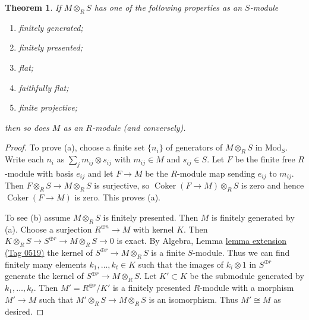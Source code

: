 \documentclass{amsart}
\theoremstyle{plain}
\newtheorem{theorem}[subsection]{Theorem}
\theoremstyle{definition}
\theoremstyle{remark}
\numberwithin{equation}{subsection}
\def\Coker{\mathop{\mathrm{Coker}}}
\begin{document}
\begin{theorem}
\label{theorem-descend-module-properties}
If $M \otimes_R S$ has one of the following properties as an $S$-module
\begin{enumerate}
\item[(a)]
finitely generated;
\item[(b)]
finitely presented;
\item[(c)]
flat;
\item[(d)]
faithfully flat;
\item[(e)]
finite projective;
\end{enumerate}
then so does $M$ as an $R$-module (and conversely).
\end{theorem}

\begin{proof}
To prove (a), choose a finite set $\{n_i\}$ of generators of $M \otimes_R S$
in $\text{Mod}_S$. Write each $n_i$ as $\sum_j m_{ij} \otimes s_{ij}$ with
$m_{ij} \in M$ and $s_{ij} \in S$. Let $F$ be the finite free $R$-module with
basis $e_{ij}$ and let $F \to M$ be the $R$-module map sending $e_{ij}$ to
$m_{ij}$. Then $F \otimes_R S\to M \otimes_R S$ is surjective, so
$\Coker(F \to M) \otimes_R S$ is zero and hence $\Coker(F \to M)$
is zero. This proves (a).

\medskip\noindent
To see (b) assume $M \otimes_R S$ is finitely presented. Then $M$ is finitely
generated by (a). Choose a surjection $R^{\oplus n} \to M$ with kernel $K$.
Then $K \otimes_R S \to S^{\oplus r} \to M \otimes_R S \to 0$ is exact.
By Algebra, Lemma \href{https://stacks.math.columbia.edu/tag/0519}{lemma extension (Tag 0519)}
the kernel of $S^{\oplus r} \to M \otimes_R S$
is a finite $S$-module. Thus we can find finitely many elements
$k_1, \ldots, k_t \in K$ such that the images of $k_i \otimes 1$ in
$S^{\oplus r}$ generate the kernel of $S^{\oplus r} \to M \otimes_R S$.
Let $K' \subset K$ be the submodule generated by $k_1, \ldots, k_t$.
Then $M' = R^{\oplus r}/K'$ is a finitely presented $R$-module
with a morphism $M' \to M$ such that $M' \otimes_R S \to M \otimes_R S$
is an isomorphism. Thus $M' \cong M$ as desired.


\end{proof}
\end{document}
